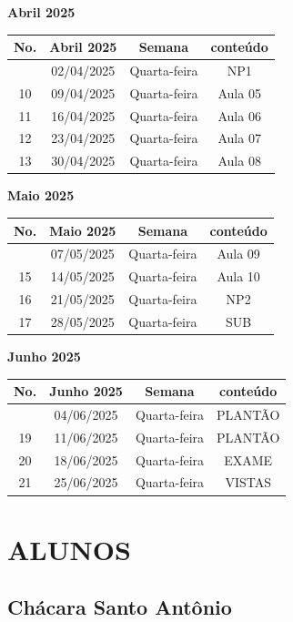 \documentclass[
]{book}
\begin{document}
\textbf{Abril 2025}

\begin{longtable}[]{@{}cccc@{}}
\toprule\noalign{}
No. & Abril 2025 & Semana & conteúdo \\
\midrule\noalign{}
\endhead
\bottomrule\noalign{}
\endlastfoot
9 & 02/04/2025 & Quarta-feira & NP1 \\
10 & 09/04/2025 & Quarta-feira & Aula 05 \\
11 & 16/04/2025 & Quarta-feira & Aula 06 \\
12 & 23/04/2025 & Quarta-feira & Aula 07 \\
13 & 30/04/2025 & Quarta-feira & Aula 08 \\
\end{longtable}

\textbf{Maio 2025}

\begin{longtable}[]{@{}cccc@{}}
\toprule\noalign{}
No. & Maio 2025 & Semana & conteúdo \\
\midrule\noalign{}
\endhead
\bottomrule\noalign{}
\endlastfoot
14 & 07/05/2025 & Quarta-feira & Aula 09 \\
15 & 14/05/2025 & Quarta-feira & Aula 10 \\
16 & 21/05/2025 & Quarta-feira & NP2 \\
17 & 28/05/2025 & Quarta-feira & SUB \\
\end{longtable}

\textbf{Junho 2025}

\begin{longtable}[]{@{}cccc@{}}
\toprule\noalign{}
No. & Junho 2025 & Semana & conteúdo \\
\midrule\noalign{}
\endhead
\bottomrule\noalign{}
\endlastfoot
18 & 04/06/2025 & Quarta-feira & PLANTÃO \\
19 & 11/06/2025 & Quarta-feira & PLANTÃO \\
20 & 18/06/2025 & Quarta-feira & EXAME \\
21 & 25/06/2025 & Quarta-feira & VISTAS \\
\end{longtable}

\section{ALUNOS}\label{alunos}

\subsection{Chácara Santo Antônio}\label{chuxe1cara-santo-antuxf4nio-1}
\end{document}
